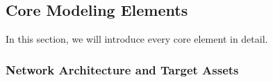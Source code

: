

\subsection{Core Modeling Elements}
% 
In this section, we will introduce every core element in detail.

\subsubsection{Network Architecture and Target Assets}

